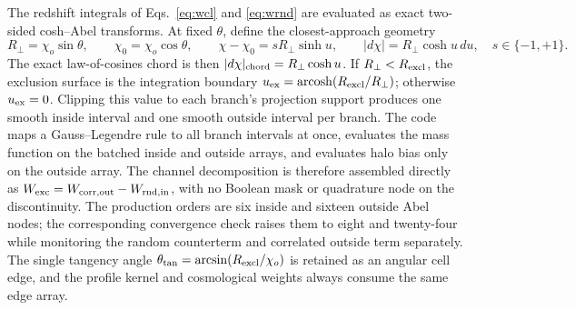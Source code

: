 The redshift integrals of Eqs.~\eqref{eq:wcl} and \eqref{eq:wrnd} are
evaluated as exact two-sided cosh--Abel transforms.  At fixed $\theta$,
define the closest-approach geometry
\begin{equation}
R_\perp=\chi_o\sin\theta,\qquad
\chi_0=\chi_o\cos\theta,\qquad
\chi-\chi_0=sR_\perp\sinh u,\qquad
|d\chi|=R_\perp\cosh u\,du,
\quad s\in\{-1,+1\}.
\label{eq:abel}
\end{equation}
The exact law-of-cosines chord is then
$|d\chi|_{\rm chord}=R_\perp\cosh u$.  If $R_\perp<R_{\rm excl}$, the
exclusion surface is the integration boundary
$u_{\rm ex}=\operatorname{arcosh}(R_{\rm excl}/R_\perp)$; otherwise
$u_{\rm ex}=0$.  Clipping this value to each branch's projection support
produces one smooth inside interval and one smooth outside interval per
branch.  The code maps a Gauss--Legendre rule to all branch intervals at
once, evaluates the mass function on the batched inside and outside
arrays, and evaluates halo bias only on the outside array.  The channel
decomposition is therefore assembled directly as
$W_{\rm exc}=W_{\rm corr,out}-W_{\rm rnd,in}$, with no Boolean mask or
quadrature node on the discontinuity.  The production orders are six
inside and sixteen outside Abel nodes; the corresponding convergence
check raises them to eight and twenty-four while monitoring the random
counterterm and correlated outside term separately.  The single
tangency angle $\theta_{\rm tan}=\arcsin(R_{\rm excl}/\chi_o)$ is retained as
an angular cell edge, and the profile kernel and cosmological weights
always consume the same edge array.
